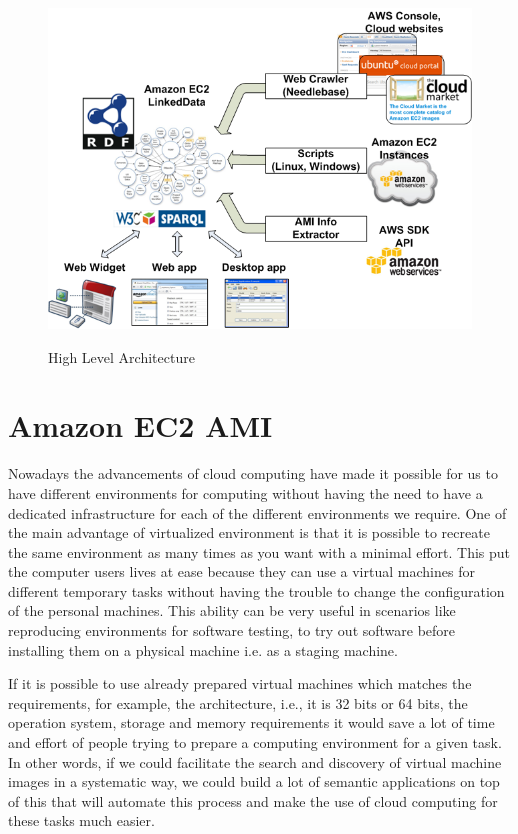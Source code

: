\begin{figure}[h!t!]
  \caption{High Level Architecture}
  \centering
    \includegraphics[scale=0.6]{EC2LD.png}
   \label{fig:architecture}
\end{figure}

\section{Amazon EC2 AMI}\label{sec:ec2}

Nowadays the advancements of cloud computing have made it possible for us to have different environments for computing without having the need to have a dedicated infrastructure for each of the different environments we require. One of the main advantage of virtualized environment is that it is possible to recreate the same environment as many times as you want with a minimal effort. This put the computer users lives at ease because they can use a virtual machines for different temporary tasks without having the trouble to change the configuration of the personal machines. This ability can be very useful in scenarios like reproducing environments for software testing, to try out software before installing them on a physical machine i.e. as a staging machine. 

If it is possible to use already prepared virtual machines which matches the requirements, for example, the architecture, i.e., it is 32 bits or 64 bits, the operation system, storage and memory requirements it would save a lot of time and effort of people trying to prepare a computing environment for a given task. In other words, if we could facilitate the search and discovery of virtual machine images in a systematic way, we could build a lot of semantic applications on top of this that will automate this process and make the use of cloud computing for these tasks much easier. 

